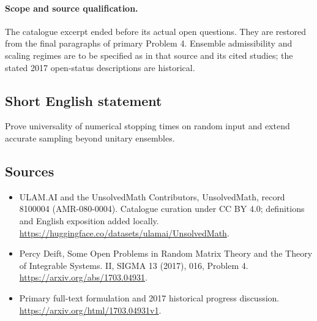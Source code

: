 \documentclass[11pt]{article}
\begin{document}
\paragraph{Scope and source qualification.}The catalogue excerpt ended before its actual open questions. They are restored from the final paragraphs of primary Problem 4. Ensemble admissibility and scaling regimes are to be specified as in that source and its cited studies; the stated 2017 open-status descriptions are historical.
\subsection{Short English statement}
Prove universality of numerical stopping times on random input and extend accurate sampling beyond unitary ensembles.
\subsection{Sources}
\begin{itemize}
\item[\hypertarget{source:8100004:1}{S1}] ULAM.AI and the UnsolvedMath Contributors, UnsolvedMath, record 8100004 (AMR-080-0004). Catalogue curation under CC BY 4.0; definitions and English exposition added locally.
\url{https://huggingface.co/datasets/ulamai/UnsolvedMath}.
\item[\hypertarget{source:8100004:2}{S2}] Percy Deift, Some Open Problems in Random Matrix Theory and the Theory of Integrable Systems. II, SIGMA 13 (2017), 016, Problem 4.
\url{https://arxiv.org/abs/1703.04931}.
\item[\hypertarget{source:8100004:3}{S3}] Primary full-text formulation and 2017 historical progress discussion.
\url{https://arxiv.org/html/1703.04931v1}.
\end{itemize}
\label{end:8100004}
\end{document}
